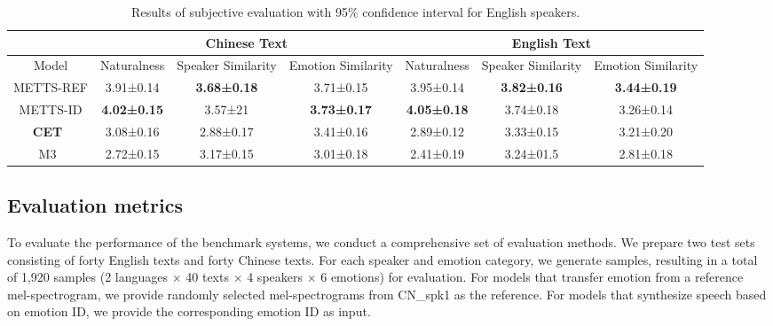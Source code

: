 \documentclass[journal,comsoc]{IEEEtran}
\begin{document}
\begin{table}[htb]
\centering
\caption{Results of subjective evaluation with 95$\%$ confidence interval for English speakers.}
\label{tab_2}
\begin{tabular}{@{}c|ccc|ccc@{}}
\toprule
                             & \multicolumn{3}{c|}{Chinese Text}                            & \multicolumn{3}{c}{English Text}                      \\ \midrule
Model                        & Naturalness & Speaker Similarity & Emotion Similarity & Naturalness & Speaker Similarity & Emotion Similarity \\ \midrule
METTS-REF    & 3.91±0.14          & \textbf{3.68±0.18} & 3.71±0.15          & 3.95±0.14          & \textbf{3.82±0.16} & \textbf{3.44±0.19} \\
METTS-ID     & \textbf{4.02±0.15} & 3.57±21            & \textbf{3.73±0.17} & \textbf{4.05±0.18} & 3.74±0.18          & 3.26±0.14          \\
\textbf{CET}~\cite{DBLP:journals/corr/abs-2110-04153}      & 3.08±0.16          & 2.88±0.17          & 3.41±0.16          & 2.89±0.12          & 3.33±0.15          & 3.21±0.20          \\
M3~\cite{DBLP:conf/interspeech/ShangHZZ021}     & 2.72±0.15          & 3.17±0.15          & 3.01±0.18          & 2.41±0.19          & 3.24±01.5          & 2.81±0.18          \\
\bottomrule
\end{tabular}
\end{table}

\subsection{Evaluation metrics} 
\label{sc:evaluation}


To evaluate the performance of the benchmark systems, we conduct a comprehensive set of evaluation methods. We prepare two test sets consisting of forty English texts and forty Chinese texts. For each speaker and emotion category, we generate samples, resulting in a total of 1,920 samples (2 languages $\times$ 40 texts $\times$ 4 speakers $\times$ 6 emotions) for evaluation. For models that transfer emotion from a reference mel-spectrogram, we provide randomly selected mel-spectrograms from CN\_spk1 as the reference. For models that synthesize speech based on emotion ID, we provide the corresponding emotion ID as input.
\end{document}
